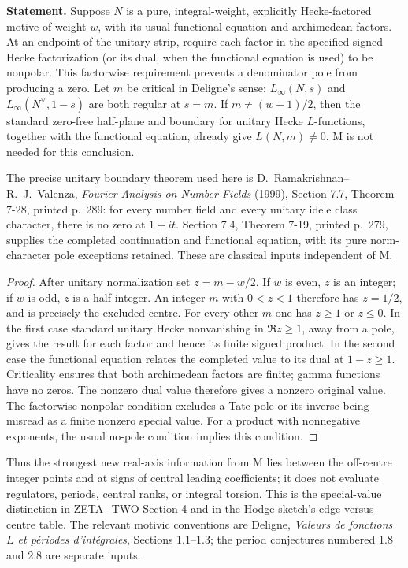 \documentclass[11pt,a4paper]{article}
\begin{document}
\textbf{Statement.} Suppose $N$ is a pure, integral-weight, explicitly
Hecke-factored motive of weight $w$, with its usual functional equation
and archimedean factors. At an endpoint of the unitary strip, require each
factor in the specified signed Hecke factorization (or its dual, when the
functional equation is used) to be nonpolar. This factorwise requirement
prevents a denominator pole from producing a zero. Let $m$ be critical in
Deligne's sense: $L_\infty(N,s)$ and $L_\infty(N^\vee,1-s)$
are both regular at $s=m$. If $m\ne(w+1)/2$, then the standard
zero-free half-plane and boundary for unitary Hecke $L$-functions,
together with the functional equation, already give $L(N,m)\ne0$.
M is not needed for this conclusion.

The precise unitary boundary theorem used here is
D.~Ramakrishnan--R.~J.~Valenza, \emph{Fourier Analysis on Number Fields}
(1999), Section 7.7, Theorem 7-28, printed p.~289: for every number
field and every unitary idele class character, there is no zero at
$1+it$. Section 7.4, Theorem 7-19, printed p.~279, supplies the completed
continuation and functional equation, with its pure norm-character pole
exceptions retained. These are classical inputs independent of M.

\begin{proof}
After unitary normalization set $z=m-w/2$. If $w$ is even, $z$ is an
integer; if $w$ is odd, $z$ is a half-integer. An integer $m$ with
$0<z<1$ therefore has $z=1/2$, and is precisely the excluded centre.
For every other $m$ one has $z\ge1$ or $z\le0$. In the first case
standard unitary Hecke nonvanishing in $\Re z\ge1$, away from a pole,
gives the result for each factor and hence its finite signed product.
In the second case the functional equation relates the completed value
to its dual at $1-z\ge1$. Criticality ensures that both archimedean
factors are finite; gamma functions have no zeros. The nonzero dual
value therefore gives a nonzero original value. The factorwise nonpolar
condition excludes a Tate pole or its inverse being misread as a finite
nonzero special value. For a product with nonnegative exponents, the
usual no-pole condition implies this condition.
\end{proof}

Thus the strongest new real-axis information from M lies between the
off-centre integer points and at signs of central leading coefficients;
it does not evaluate regulators, periods, central ranks, or integral
torsion. This is the special-value distinction in ZETA\_TWO Section 4
and in the Hodge sketch's edge-versus-centre table. The relevant motivic
conventions are Deligne, \emph{Valeurs de fonctions $L$ et p\'eriodes
d'int\'egrales}, Sections 1.1--1.3; the period conjectures numbered 1.8
and 2.8 are separate inputs.
\end{document}
